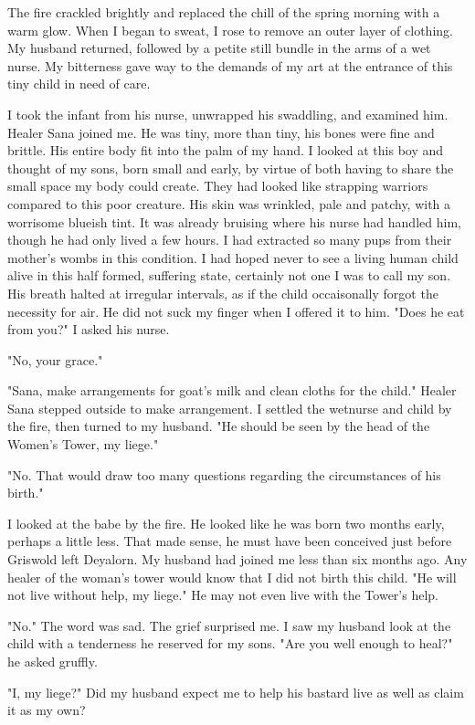 \documentclass{article}
\begin{document}
The fire crackled brightly and replaced the chill of the spring morning with a warm glow. When I began to sweat, I rose to remove an outer layer of clothing. My husband returned, followed by a petite still bundle in the arms of a wet nurse. My bitterness gave way to the demands of my art at the entrance of this tiny child in need of care. 

I took the infant from his nurse, unwrapped his swaddling, and examined him.  Healer Sana joined me. He was tiny, more than tiny, his bones were fine and brittle. His entire body fit into the palm of my hand. I looked at this boy and thought of my sons, born small and early, by virtue of both having to share the small space my body could create. They had looked like strapping warriors compared to this poor creature. His skin was wrinkled, pale and patchy, with a worrisome blueish tint. It was already bruising where his nurse had handled him, though he had only lived a few hours. I had extracted so many pups from their mother's wombs in this condition. I had hoped never to see a living human child alive in this half formed, suffering state, certainly not one I was to call my son. His breath halted at irregular intervals, as if the child occaisonally forgot the necessity for air. He did not suck my finger when I offered it to him. "Does he eat from you?" I asked his nurse.

"No, your grace."

"Sana, make arrangements for goat's milk and clean cloths for the child." Healer Sana stepped outside to make arrangement. I settled the wetnurse and child by the fire, then turned to my husband. "He should be seen by the head of the Women's Tower, my liege." 

"No. That would draw too many questions regarding the circumstances of his birth."

I looked at the babe by the fire. He looked like he was born two months early, perhaps a little less. That made sense, he must have been conceived just before Griswold left Deyalorn. My husband had joined me less than six months ago. Any healer of the woman's tower would know that I did not birth this child. "He will not live without help, my liege." He may not even live with the Tower's help.

"No." The word was sad. The grief surprised me. I saw my husband look at the child with a tenderness he reserved for my sons. "Are you well enough to heal?" he asked gruffly.

"I, my liege?" Did my husband expect me to help his bastard live as well as claim it as my own?
\end{document}
